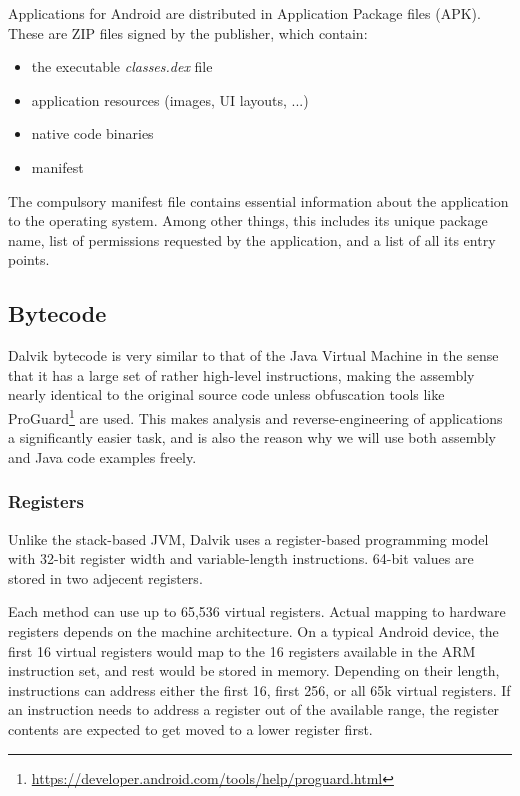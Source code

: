 \documentclass[12pt,twoside,notitlepage]{report}
\begin{document}
Applications for Android are distributed in Application Package files (APK). These are ZIP files signed by the publisher, which contain:
\begin{itemize}
\item the executable \emph{classes.dex} file
\item application resources (images, UI layouts, ...)
\item native code binaries
\item manifest
\end{itemize}

The compulsory manifest file contains essential information about the application to the operating system. Among other things, this includes its unique package name, list of permissions requested by the application, and a list of all its entry points.

\subsection{Bytecode}

Dalvik bytecode is very similar to that of the Java Virtual Machine in the sense that it has a large set of rather high-level instructions, making the assembly nearly identical to the original source code unless obfuscation tools like ProGuard\footnote{\url{https://developer.android.com/tools/help/proguard.html}} are used. This makes analysis and reverse-engineering of applications a significantly easier task, and is also the reason why we will use both assembly and Java code examples freely.

\subsubsection{Registers}

Unlike the stack-based JVM, Dalvik uses a register-based programming model with 32-bit register width and variable-length instructions. 64-bit values are stored in two adjecent registers.

Each method can use up to 65,536 virtual registers. Actual mapping to hardware registers depends on the machine architecture. On a typical Android device, the first 16 virtual registers would map to the 16 registers available in the ARM instruction set, and rest would be stored in memory. Depending on their length, instructions can address either the first 16, first 256, or all 65k virtual registers. If an instruction needs to address a register out of the available range, the register contents are expected to get moved to a lower register first.
\end{document}

